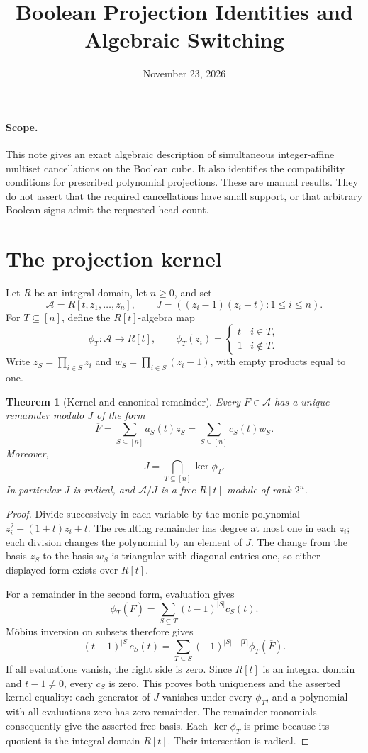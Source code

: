 \documentclass[11pt]{article}
\title{Boolean Projection Identities and Algebraic Switching}
\author{}
\date{November 23, 2026}
\newtheorem{theorem}{Theorem}
\begin{document}
\maketitle

\paragraph{Scope.}
This note gives an exact algebraic description of simultaneous
integer-affine multiset cancellations on the Boolean cube. It also
identifies the compatibility conditions for prescribed polynomial
projections. These are manual results. They do not assert that the
required cancellations have small support, or that arbitrary Boolean
signs admit the requested head count.

\section{The projection kernel}

Let $R$ be an integral domain, let $n\geq 0$, and set
\[
 \mathcal A=R[t,z_1,\ldots,z_n],\qquad
 J=((z_i-1)(z_i-t):1\leq i\leq n).
\]
For $T\subseteq[n]$, define the $R[t]$-algebra map
\[
 \phi_T:\mathcal A\longrightarrow R[t],\qquad
 \phi_T(z_i)=\begin{cases}t&i\in T,\\1&i\notin T.\end{cases}
\]
Write $z_S=\prod_{i\in S}z_i$ and
$w_S=\prod_{i\in S}(z_i-1)$, with empty products equal to one.

\begin{theorem}[Kernel and canonical remainder]
Every $F\in\mathcal A$ has a unique remainder modulo $J$ of the form
\[
 \overline F=\sum_{S\subseteq[n]}a_S(t)z_S
            =\sum_{S\subseteq[n]}c_S(t)w_S.
\]
Moreover,
\[
 J=\bigcap_{T\subseteq[n]}\ker\phi_T.
\]
In particular $J$ is radical, and $\mathcal A/J$ is a free
$R[t]$-module of rank $2^n$.
\end{theorem}
\begin{proof}
Divide successively in each variable by the monic polynomial
$z_i^2-(1+t)z_i+t$. The resulting remainder has degree at most one
in each $z_i$; each division changes the polynomial by an element
of $J$. The change from the basis $z_S$ to the basis $w_S$ is
triangular with diagonal entries one, so either displayed form
exists over $R[t]$.

For a remainder in the second form, evaluation gives
\[
 \phi_T(\overline F)=\sum_{S\subseteq T}(t-1)^{|S|}c_S(t).
\]
M\"obius inversion on subsets therefore gives
\[
 (t-1)^{|S|}c_S(t)
 =\sum_{T\subseteq S}(-1)^{|S|-|T|}\phi_T(\overline F).
\]
If all evaluations vanish, the right side is zero. Since $R[t]$
is an integral domain and $t-1\neq0$, every $c_S$ is zero.
This proves both uniqueness and the asserted kernel equality:
each generator of $J$ vanishes under every $\phi_T$, and a
polynomial with all evaluations zero has zero remainder.
The remainder monomials consequently give the asserted free basis.
Each $\ker\phi_T$ is prime because its quotient is the integral
domain $R[t]$. Their intersection is radical.
\end{proof}
\end{document}
